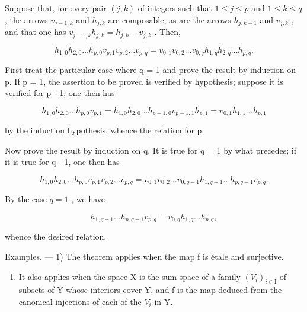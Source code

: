 Suppose that, for every pair \((j,k)\) of integers such that \(1 \leqslant j \leqslant p\) and \(1 \leqslant k \leqslant q\) , the arrows \(v_{j-1,k}\) and \(h_{j,k}\) are composable, as are the arrows \(h_{j,k-1}\) and \(v_{j,k}\) , and that one has \(v_{j-1,k}h_{j,k} = h_{j,k-1}v_{j,k}\) . Then,

\[
h _ {1, 0} h _ {2, 0} \dots h _ {p, 0} v _ {p, 1} v _ {p, 2} \dots v _ {p, q} = v _ {0, 1} v _ {0, 2} \dots v _ {0, q} h _ {1, q} h _ {2, q} \dots h _ {p, q}.
\]

First treat the particular case where q = 1 and prove the result by induction on p. If p = 1, the assertion to be proved is verified by hypothesis; suppose it is verified for p - 1; one then has

\[
h _ {1, 0} h _ {2, 0} \dots h _ {p, 0} v _ {p, 1} = h _ {1, 0} h _ {2, 0} \dots h _ {p - 1, 0} v _ {p - 1, 1} h _ {p, 1} = v _ {0, 1} h _ {1, 1} \dots h _ {p, 1}
\]

by the induction hypothesis, whence the relation for p.

Now prove the result by induction on q. It is true for q = 1 by what precedes; if it is true for q - 1, one then has

\[
h _ {1, 0} h _ {2, 0} \dots h _ {p, 0} v _ {p, 1} v _ {p, 2} \dots v _ {p, q} = v _ {0, 1} v _ {0, 2} \dots v _ {0, q - 1} h _ {1, q - 1} \dots h _ {p, q - 1} v _ {p, q}.
\]

By the case \(q = 1\) , we have

\[
h _ {1, q - 1} \dots h _ {p, q - 1} v _ {p, q} = v _ {0, q} h _ {1, q} \dots h _ {p, q},
\]

whence the desired relation.

Examples. --- 1) The theorem applies when the map f is étale and surjective.

\begin{enumerate}
\def\labelenumi{\arabic{enumi})}
\setcounter{enumi}{1}
\tightlist
\item
  It also applies when the space X is the sum space of a family \((V_{i})_{i\in\mathrm{I}}\) of subsets of Y whose interiors cover Y, and f is the map deduced from the canonical injections of each of the \(V_{i}\) in Y.
\end{enumerate}

